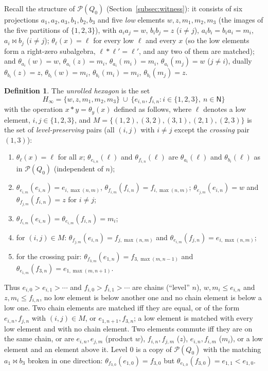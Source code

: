 \documentclass[11pt]{amsart}
\theoremstyle{definition}
\newtheorem{definition}[theorem]{Definition}
\renewcommand{\P}{\mathcal{P}}
\newcommand{\N}{\mathsf{N}}
\begin{document}
Recall the structure of $\P(Q_0)$ (Section~\ref{subsec:witness}): it consists of six projections $a_1,a_2,a_3,b_1,b_2,b_3$ and five \emph{low} elements $w,z,m_1,m_2,m_3$ (the images of the five partitions of $\{1,2,3\}$), with $a_ia_j=w$, $b_ib_j=z$ ($i\ne j$), $a_ib_i=b_ia_i=m_i$, $a_i\bowtie b_j$ ($i\ne j$); $\theta_\ell(x)=\ell$ for every low $\ell$ and every $x$ (so the low elements form a right-zero subalgebra, $\ell*\ell'=\ell'$, and any two of them are matched); and $\theta_{a_i}(w)=w$, $\theta_{a_i}(z)=m_i$, $\theta_{a_i}(m_i)=m_i$, $\theta_{a_i}(m_j)=w$ ($j\ne i$), dually $\theta_{b_i}(z)=z$, $\theta_{b_i}(w)=m_i$, $\theta_{b_i}(m_i)=m_i$, $\theta_{b_i}(m_j)=z$.

\begin{definition}\label{def:hinf}
The \emph{unrolled hexagon} is the set
\[
H_\infty=\{w,z,m_1,m_2,m_3\}\ \cup\ \{e_{i,n},f_{i,n}: i\in\{1,2,3\},\ n\in\N\}
\]
with the operation $x*y=\theta_y(x)$ defined as follows, where $\ell$ denotes a low element, $i,j\in\{1,2,3\}$, and $M=\{(1,2),(3,2),(3,1),(2,1),(2,3)\}$ is the set of \emph{level-preserving} pairs (all $(i,j)$ with $i\ne j$ except the \emph{crossing} pair $(1,3)$):
\begin{enumerate}[label=\textup{(\roman*)},nosep]
\item $\theta_\ell(x)=\ell$ for all $x$; $\theta_{e_{i,n}}(\ell)$ and $\theta_{f_{i,n}}(\ell)$ are $\theta_{a_i}(\ell)$ and $\theta_{b_i}(\ell)$ as in $\P(Q_0)$ (independent of $n$);
\item $\theta_{e_{i,m}}(e_{i,n})=e_{i,\max(n,m)}$, $\theta_{f_{i,m}}(f_{i,n})=f_{i,\max(n,m)}$; $\theta_{e_{j,m}}(e_{i,n})=w$ and $\theta_{f_{j,m}}(f_{i,n})=z$ for $i\ne j$;
\item $\theta_{f_{i,m}}(e_{i,n})=\theta_{e_{i,m}}(f_{i,n})=m_i$;
\item for $(i,j)\in M$: $\theta_{f_{j,m}}(e_{i,n})=f_{j,\max(n,m)}$ and $\theta_{e_{i,m}}(f_{j,n})=e_{i,\max(n,m)}$;
\item for the crossing pair: $\theta_{f_{3,m}}(e_{1,n})=f_{3,\max(m,n-1)}$ and $\theta_{e_{1,m}}(f_{3,n})=e_{1,\max(m,n+1)}$.
\end{enumerate}
\end{definition}

Thus $e_{i,0}>e_{i,1}>\cdots$ and $f_{i,0}>f_{i,1}>\cdots$ are chains (``level'' $n$), $w,m_i\le e_{i,n}$ and $z,m_i\le f_{i,n}$, no low element is below another one and no chain element is below a low one. Two chain elements are matched iff they are equal, or of the form $e_{i,n},f_{j,n}$ with $(i,j)\in M$, or $e_{1,n+1},f_{3,n}$; a low element is matched with every low element and with no chain element. Two elements commute iff they are on the same chain, or are $e_{i,n},e_{j,m}$ (product $w$), $f_{i,n},f_{j,m}$ ($z$), $e_{i,n},f_{i,m}$ ($m_i$), or a low element and an element above it. Level $0$ is a copy of $\P(Q_0)$ with the matching $a_1\bowtie b_3$ broken in one direction: $\theta_{f_{3,0}}(e_{1,0})=f_{3,0}$ but $\theta_{e_{1,0}}(f_{3,0})=e_{1,1}<e_{1,0}$.
\end{document}
